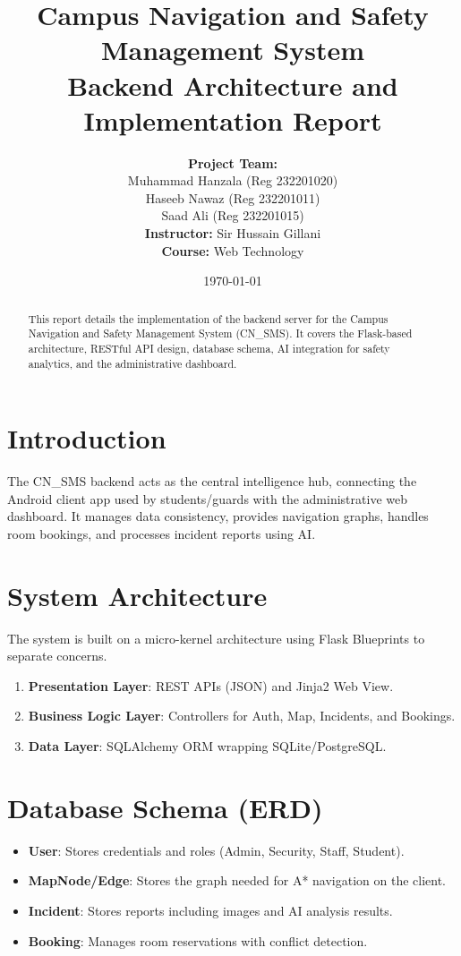 \documentclass[a4paper,12pt]{article}
\title{
    \textbf{Campus Navigation and Safety Management System} \\
    \large Backend Architecture and Implementation Report
}
\author{
    \textbf{Project Team:} \\
    Muhammad Hanzala (Reg 232201020) \\
    Haseeb Nawaz (Reg 232201011) \\
    Saad Ali (Reg 232201015) \\[1em]
    \textbf{Instructor:} Sir Hussain Gillani \\
    \textbf{Course:} Web Technology
}
\date{\today}
\begin{document}
\maketitle

\begin{abstract}
This report details the implementation of the backend server for the Campus Navigation and Safety Management System (CN\_SMS). It covers the Flask-based architecture, RESTful API design, database schema, AI integration for safety analytics, and the administrative dashboard.
\end{abstract}

\tableofcontents
\newpage

\section{Introduction}
The CN\_SMS backend acts as the central intelligence hub, connecting the Android client app used by students/guards with the administrative web dashboard. It manages data consistency, provides navigation graphs, handles room bookings, and processes incident reports using AI.

\section{System Architecture}
The system is built on a micro-kernel architecture using Flask Blueprints to separate concerns.
\begin{enumerate}
    \item \textbf{Presentation Layer}: REST APIs (JSON) and Jinja2 Web View.
    \item \textbf{Business Logic Layer}: Controllers for Auth, Map, Incidents, and Bookings.
    \item \textbf{Data Layer}: SQLAlchemy ORM wrapping SQLite/PostgreSQL.
\end{enumerate}

\section{Database Schema (ERD)}
\begin{itemize}
    \item \textbf{User}: Stores credentials and roles (Admin, Security, Staff, Student).
    \item \textbf{MapNode/Edge}: Stores the graph needed for A* navigation on the client.
    \item \textbf{Incident}: Stores reports including images and AI analysis results.
    \item \textbf{Booking}: Manages room reservations with conflict detection.
\end{itemize}
\end{document}
